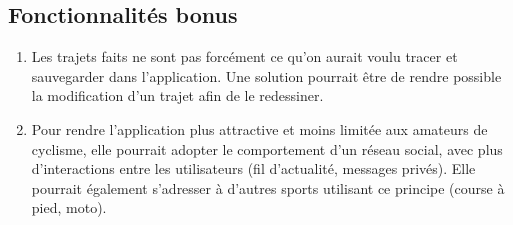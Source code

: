 \subsection{Fonctionnalités bonus}
\begin{enumerate}
  \item Les trajets faits ne sont pas forcément ce qu'on aurait voulu tracer et sauvegarder dans l'application. Une solution pourrait être de
  rendre possible la modification d'un trajet afin de le redessiner.
  \item Pour rendre l'application plus attractive et moins limitée aux amateurs de cyclisme, elle pourrait adopter le comportement d'un réseau
  social, avec plus d'interactions entre les utilisateurs (fil d'actualité, messages privés). Elle pourrait également s'adresser à d'autres sports utilisant ce principe (course à pied, moto).
\end{enumerate}